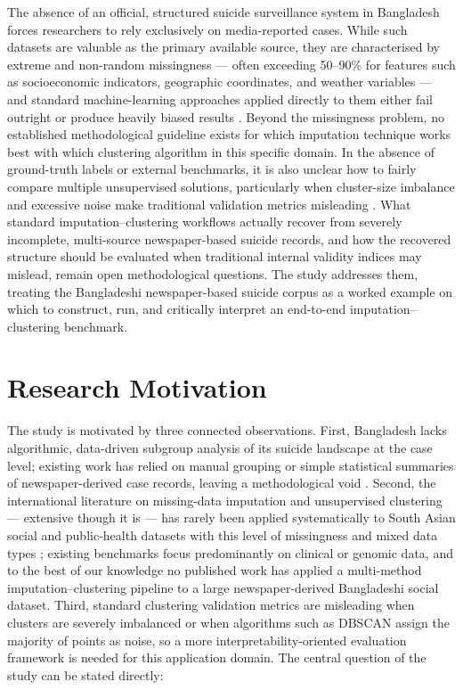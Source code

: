 The absence of an official, structured suicide surveillance system in Bangladesh forces researchers to rely exclusively on media-reported cases. While such datasets are valuable as the primary available source, they are characterised by extreme and non-random missingness --- often exceeding 50--90\% for features such as socioeconomic indicators, geographic coordinates, and weather variables --- and standard machine-learning approaches applied directly to them either fail outright or produce heavily biased results \cite{ref6,ref55}. Beyond the missingness problem, no established methodological guideline exists for which imputation technique works best with which clustering algorithm in this specific domain. In the absence of ground-truth labels or external benchmarks, it is also unclear how to fairly compare multiple unsupervised solutions, particularly when cluster-size imbalance and excessive noise make traditional validation metrics misleading \cite{ref8}. What standard imputation--clustering workflows actually recover from severely incomplete, multi-source newspaper-based suicide records, and how the recovered structure should be evaluated when traditional internal validity indices may mislead, remain open methodological questions. The study addresses them, treating the Bangladeshi newspaper-based suicide corpus as a worked example on which to construct, run, and critically interpret an end-to-end imputation--clustering benchmark.

\section{Research Motivation}

The study is motivated by three connected observations. First, Bangladesh lacks algorithmic, data-driven subgroup analysis of its suicide landscape at the case level; existing work has relied on manual grouping or simple statistical summaries of newspaper-derived case records, leaving a methodological void \cite{ref51,ref50}. Second, the international literature on missing-data imputation and unsupervised clustering --- extensive though it is --- has rarely been applied systematically to South Asian social and public-health datasets with this level of missingness and mixed data types \cite{ref8,ref55}; existing benchmarks focus predominantly on clinical or genomic data, and to the best of our knowledge no published work has applied a multi-method imputation--clustering pipeline to a large newspaper-derived Bangladeshi social dataset. Third, standard clustering validation metrics are misleading when clusters are severely imbalanced or when algorithms such as DBSCAN assign the majority of points as noise, so a more interpretability-oriented evaluation framework is needed for this application domain. The central question of the study can be stated directly:


